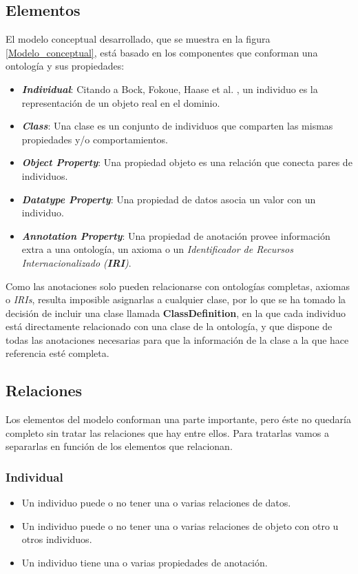 \subsection{Elementos}\label{Elementos_modelo_conceptual}
El modelo conceptual desarrollado, que se muestra en la figura \ref{Modelo_conceptual}, está basado en los componentes 
que conforman una ontología y sus propiedades:
\begin{itemize}
    \item \textit{\textbf{Individual}}: Citando a Bock, Fokoue, Haase et al. \autocite*{Bock2012}, un individuo es la 
    representación de un objeto real en el dominio.
    \item \textit{\textbf{Class}}: Una clase es un conjunto de individuos que comparten las mismas propiedades y/o 
    comportamientos.
    \item \textit{\textbf{Object Property}}: Una propiedad objeto es una relación que conecta pares de individuos.
    \item \textit{\textbf{Datatype Property}}: Una propiedad de datos asocia un valor con un individuo.
    \item \textit{\textbf{Annotation Property}}: Una propiedad de anotación provee información extra a una ontología, un axioma 
    o un \textit{Identificador de Recursos Internacionalizado (\textbf{IRI})}.
\end{itemize}

Como las anotaciones solo pueden relacionarse con ontologías completas, axiomas o \textit{IRIs}, resulta imposible asignarlas a cualquier clase, 
por lo que se ha tomado la decisión de incluir una clase llamada \textbf{ClassDefinition}, en la que cada individuo está 
directamente relacionado con una clase de la ontología, y que dispone de todas las anotaciones necesarias para que la información 
de la clase a la que hace referencia esté completa. 

\subsection{Relaciones}
Los elementos del modelo conforman una parte importante, pero éste no quedaría completo sin tratar las relaciones que hay entre 
ellos. Para tratarlas vamos a separarlas en función de los elementos que relacionan.
\subsubsection{Individual}
\begin{itemize}
    \item Un individuo puede o no tener una o varias relaciones de datos.
    \item Un individuo puede o no tener una o varias relaciones de objeto con otro u otros individuos.
    \item Un individuo tiene una o varias propiedades de anotación.
\end{itemize}

